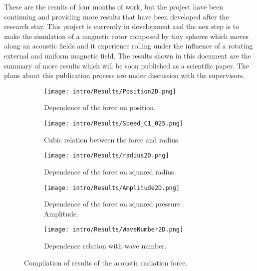 These are the results of four months of work, but the project have been continuing and providing more results that have been developed after the research stay. This project is currently in development and the nex step is to make the simulation of a magnetic rotor composed by tiny spheres which moves along an acoustic fields and it experience rolling under the influence of a rotating external and uniform magnetic field. The results shown in this document are the summary of more results which will be soon published as a scientific paper. The plans about this publication process are under discussion with the supervisors.

\begin{figure*}
    \begin{subfigure}{0.4\textwidth}
    \centering
    \texttt{[image: intro/Results/Position2D.png]}
    \caption{Dependence of the force on position.}
    \label{fig:position}
    \end{subfigure}
    \begin{subfigure}{0.35\textwidth}
    \centering
    \texttt{[image: intro/Results/Speed\_C1\_025.png]}
    \caption{Cubic relation between the force and radius.}
    \label{fig:radius}
    \end{subfigure}
    \begin{subfigure}{0.4\textwidth}
    \centering
    \texttt{[image: intro/Results/radius2D.png]}
    \caption{Dependence of the force on squared radius.}
    \label{fig:position}
    \end{subfigure}
    \begin{subfigure}{0.35\textwidth}
    \centering
    \texttt{[image: intro/Results/Amplitude2D.png]}
    \caption{Dependence of the force on squared pressure Amplitude.}
    \label{fig:radius}
    \end{subfigure}
    \begin{subfigure}{0.35\textwidth}
    \centering
    \texttt{[image: intro/Results/WaveNumber2D.png]}
    \caption{Dependence relation with wave number.}
    \label{fig:radius}
    \end{subfigure}
    \caption{Compilation of results of the acoustic radiation force.}
    \label{fig:ARF_results}
\end{figure*}

